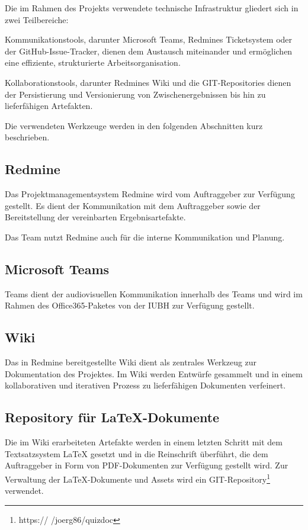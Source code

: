 \documentclass[a4paper,11pt,listof=numbered,glossary=totoc,parskip=half,toc=bib]{scrreprt}
\begin{document}
Die im Rahmen des Projekts verwendete technische Infrastruktur gliedert sich in zwei Teilbereiche:

Kommunikationstools, darunter Microsoft Teams, Redmines Ticketsystem oder der GitHub-Issue-Tracker, dienen dem Austausch miteinander und ermöglichen eine effiziente, strukturierte Arbeitsorganisation.

Kollaborationstools, darunter Redmines Wiki und die GIT-Repositories dienen der Persistierung und Versionierung von Zwischenergebnissen bis hin zu lieferfähigen Artefakten.

Die verwendeten Werkzeuge werden in den folgenden Abschnitten kurz beschrieben.

\subsection{Redmine}

Das Projektmanagementsystem Redmine wird vom Auftraggeber zur Verfügung gestellt.
Es dient der Kommunikation mit dem Auftraggeber sowie der Bereitstellung der vereinbarten Ergebnisartefakte.

Das Team nutzt Redmine auch für die interne Kommunikation und Planung.

\subsection{Microsoft Teams}

Teams dient der audiovisuellen Kommunikation innerhalb des Teams und wird im Rahmen des Office365-Paketes von der IUBH zur Verfügung gestellt.

\subsection{Wiki}

Das in Redmine bereitgestellte Wiki dient als zentrales Werkzeug zur Dokumentation des Projektes.
Im Wiki werden Entwürfe gesammelt und in einem kollaborativen und iterativen Prozess zu lieferfähigen Dokumenten verfeinert.

\subsection{Repository für LaTeX-Dokumente}

Die im Wiki erarbeiteten Artefakte werden in einem letzten Schritt mit dem Textsatzsystem LaTeX gesetzt und in die Reinschrift überführt, die dem Auftraggeber in Form von PDF-Dokumenten zur Verfügung gestellt wird.
Zur Verwaltung der LaTeX-Dokumente und Assets wird ein GIT-Repository\footnote{https://
/joerg86/quizdoc} verwendet.
\end{document}
